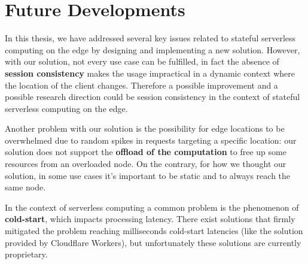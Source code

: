 \section{Future Developments}
\label{sec:future_developments}

In this thesis, we have addressed several key issues related to stateful serverless computing on the edge by designing and implementing a new solution. However, with our solution, not every use case can be fulfilled, in fact the absence of \textbf{session consistency} makes the usage impractical in a dynamic context where the location of the client changes.
Therefore a possible improvement and a possible research direction could be session consistency in the context of stateful serverless computing on the edge.

Another problem with our solution is the possibility for edge locations to be overwhelmed due to random spikes in requests targeting a specific location: our solution does not support the \textbf{offload of the computation} to free up some resources from an overloaded node. On the contrary, for how we thought our solution, in some use cases it's important to be static and to always reach the same node. 

In the context of serverless computing a common problem is the phenomenon of \textbf{cold-start}, which impacts processing latency. There exist solutions that firmly mitigated the problem reaching milliseconds cold-start latencies (like the solution provided by Cloudflare Workers), but unfortunately these solutions are currently proprietary.
